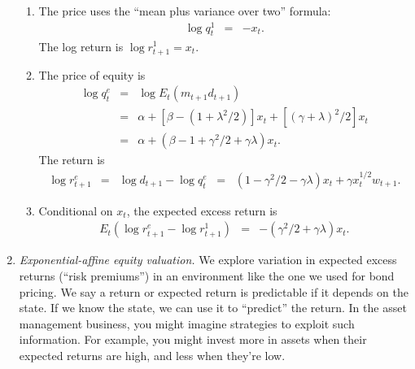 \documentclass[11pt]{article}
\begin{document}
\begin{enumerate}
\begin{enumerate}
\item  The price uses the ``mean plus variance over two'' formula:
\begin{eqnarray*}
    \log q^1_t  &=& - x_{t} .
\end{eqnarray*}
The log return is $\log r^1_{t+1} = x_t$.

\item  The price of equity is
\begin{eqnarray*}
    \log q^e_t &=& \log E_t (m_{t+1} d_{t+1} ) \\
            &=& \alpha + [\beta - (1+\lambda^2/2)] x_t
                + [(\gamma+\lambda)^2/2 ]  x_t \\
            &=& \alpha + (\beta - 1 + \gamma^2/2 + \gamma\lambda) x_t .
\end{eqnarray*}
The return is
\begin{eqnarray*}
    \log r^e_{t+1} &=& \log d_{t+1} - \log q^e_t
            \;\;=\;\; (1 - \gamma^2/2 - \gamma\lambda) x_t
                + \gamma x_t^{1/2} w_{t+1} .
\end{eqnarray*}
\item  Conditional on $x_t$, the expected excess return is
\begin{eqnarray*}
    E_t (\log r^e_{t+1} - \log r^1_{t+1} )
            &=& - (\gamma^2/2 + \gamma\lambda) x_t .
\end{eqnarray*}
\end{enumerate}

\item {\it Exponential-affine equity valuation.\/}
We explore variation in expected excess returns
(``risk premiums'') in an environment like the one we used for bond pricing.
We say a return or expected return is predictable if it depends on
the state.
If we know the state, we can use it to ``predict'' the return.
In the asset management business, you might imagine strategies to exploit such
information.
For example, you might invest more in assets when their expected returns are high,
and less when they're low.


\end{enumerate}
\end{document}

